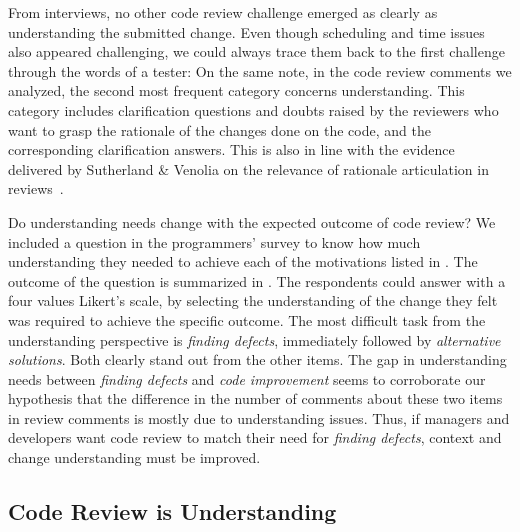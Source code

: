From interviews, no other code review challenge emerged as clearly as understanding the submitted change. Even though scheduling and time issues also appeared challenging, we could always trace them back to the first challenge through the words of a tester:  On the same note, in the code review comments we analyzed, the second most frequent category concerns understanding. This category includes clarification questions and doubts raised by the reviewers who want to grasp the rationale of the changes done on the code, and the corresponding clarification answers. This is also in line with the evidence delivered by Sutherland \& Venolia on the relevance of rationale articulation in reviews~\cite{sutherland2009can}.

Do understanding needs change with the expected outcome of code review? We included a question in the programmers' survey to know how much understanding they needed to achieve each of the motivations listed in . The outcome of the question is summarized in . The respondents could answer with a four values Likert's scale, by selecting the understanding of the change they felt was required to achieve the specific outcome. The most difficult task from the understanding perspective is \emph{finding defects}, immediately followed by \emph{alternative solutions}. Both clearly stand out from the other items. The gap in understanding needs between \emph{finding defects} and \emph{code improvement} seems to corroborate our hypothesis that the difference in the number of comments about these two items in review comments is mostly due to understanding issues. Thus, if managers and developers want code review to match their need for \emph{finding defects}, context and change understanding must be improved.


\subsection{Code Review is Understanding}

